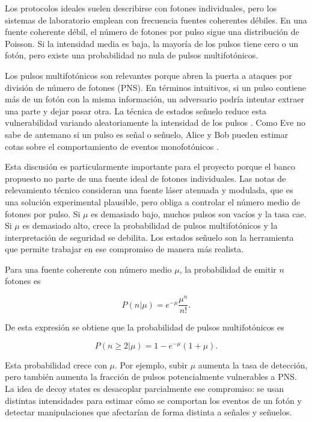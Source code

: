 Los protocolos ideales suelen describirse con fotones individuales, pero los sistemas de laboratorio emplean con frecuencia fuentes coherentes débiles. En una fuente coherente débil, el número de fotones por pulso sigue una distribución de Poisson. Si la intensidad media es baja, la mayoría de los pulsos tiene cero o un fotón, pero existe una probabilidad no nula de pulsos multifotónicos.

Los pulsos multifotónicos son relevantes porque abren la puerta a ataques por división de número de fotones (PNS). En términos intuitivos, si un pulso contiene más de un fotón con la misma información, un adversario podría intentar extraer una parte y dejar pasar otra. La técnica de estados señuelo reduce esta vulnerabilidad variando aleatoriamente la intensidad de los pulsos \cite{hwang2003decoy}. Como Eve no sabe de antemano si un pulso es señal o señuelo, Alice y Bob pueden estimar cotas sobre el comportamiento de eventos monofotónicos \cite{loMaChen2005,maQiZhaoLo2005}.

Esta discusión es particularmente importante para el proyecto porque el banco propuesto no parte de una fuente ideal de fotones individuales. Las notas de relevamiento técnico consideran una fuente láser atenuada y modulada, que es una solución experimental plausible, pero obliga a controlar el número medio de fotones por pulso. Si \(\mu\) es demasiado bajo, muchos pulsos son vacíos y la tasa cae. Si \(\mu\) es demasiado alto, crece la probabilidad de pulsos multifotónicos y la interpretación de seguridad se debilita. Los estados señuelo son la herramienta que permite trabajar en ese compromiso de manera más realista.

Para una fuente coherente con número medio \(\mu\), la probabilidad de emitir \(n\) fotones es

\begin{equation}
  P(n|\mu)=e^{-\mu}\frac{\mu^n}{n!}.
  \label{eq:poisson_wcs}
\end{equation}

De esta expresión se obtiene que la probabilidad de pulsos multifotónicos es

\begin{equation}
  P(n\geq2|\mu)=1-e^{-\mu}(1+\mu).
  \label{eq:multifoton}
\end{equation}

Esta probabilidad crece con \(\mu\). Por ejemplo, subir \(\mu\) aumenta la tasa de detección, pero también aumenta la fracción de pulsos potencialmente vulnerables a PNS. La idea de decoy states es desacoplar parcialmente ese compromiso: se usan distintas intensidades para estimar cómo se comportan los eventos de un fotón y detectar manipulaciones que afectarían de forma distinta a señales y señuelos.

